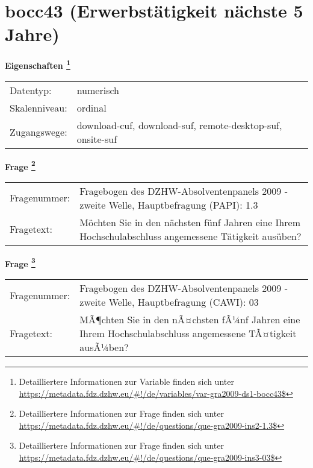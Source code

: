 
    \setcounter{footnote}{0}

    \vspace*{-1.8cm}
	\section{bocc43 (Erwerbstätigkeit nächste 5 Jahre)}
	\label{section:bocc43}



    \vspace*{0.5cm}
    \noindent\textbf{Eigenschaften
	\footnote{Detailliertere Informationen zur Variable finden sich unter
		\url{https://metadata.fdz.dzhw.eu/\#!/de/variables/var-gra2009-ds1-bocc43$}}}\\
	\begin{tabularx}{\hsize}{@{}lX}
	Datentyp: & numerisch \\
	Skalenniveau: & ordinal \\
	Zugangswege: &
	  download-cuf, 
	  download-suf, 
	  remote-desktop-suf, 
	  onsite-suf
 \\
    \end{tabularx}



				\vspace*{0.5cm}
                \noindent\textbf{Frage
	                \footnote{Detailliertere Informationen zur Frage finden sich unter
		              \url{https://metadata.fdz.dzhw.eu/\#!/de/questions/que-gra2009-ins2-1.3$}}}\\
				\begin{tabularx}{\hsize}{@{}lX}
					Fragenummer: &
					  Fragebogen des DZHW-Absolventenpanels 2009 - zweite Welle, Hauptbefragung (PAPI):
					  1.3
 \\
					Fragetext: & Möchten Sie in den nächsten fünf Jahren eine Ihrem Hochschulabschluss angemessene Tätigkeit ausüben? \\
				\end{tabularx}
				\vspace*{0.5cm}
                \noindent\textbf{Frage
	                \footnote{Detailliertere Informationen zur Frage finden sich unter
		              \url{https://metadata.fdz.dzhw.eu/\#!/de/questions/que-gra2009-ins3-03$}}}\\
				\begin{tabularx}{\hsize}{@{}lX}
					Fragenummer: &
					  Fragebogen des DZHW-Absolventenpanels 2009 - zweite Welle, Hauptbefragung (CAWI):
					  03
 \\
					Fragetext: & MÃ¶chten Sie in den nÃ¤chsten fÃ¼nf Jahren eine Ihrem Hochschulabschluss angemessene TÃ¤tigkeit ausÃ¼ben? \\
				\end{tabularx}





